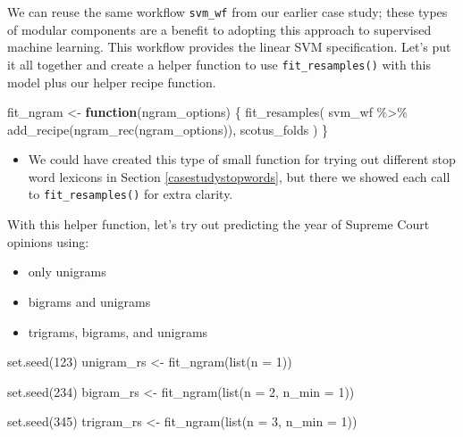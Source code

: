 \documentclass[
]{krantz}
\makeatletter
\newenvironment{Shaded}{\begin{snugshade}}{\end{snugshade}}
\newcommand{\AttributeTok}[1]{\textcolor[rgb]{0.77,0.63,0.00}{#1}}
\newcommand{\ControlFlowTok}[1]{\textcolor[rgb]{0.13,0.29,0.53}{\textbf{#1}}}
\newcommand{\DecValTok}[1]{\textcolor[rgb]{0.00,0.00,0.81}{#1}}
\newcommand{\FunctionTok}[1]{\textcolor[rgb]{0.00,0.00,0.00}{#1}}
\newcommand{\NormalTok}[1]{#1}
\newcommand{\OtherTok}[1]{\textcolor[rgb]{0.56,0.35,0.01}{#1}}
\newcommand{\SpecialCharTok}[1]{\textcolor[rgb]{0.00,0.00,0.00}{#1}}
\newenvironment{kframe}{%
\medskip{}
\setlength{\fboxsep}{.8em}
 \def\at@end@of@kframe{}%
 \ifinner\ifhmode%
  \def\at@end@of@kframe{\end{minipage}}%
  \begin{minipage}{\columnwidth}%
 \fi\fi%
 \def\FrameCommand##1{\hskip\@totalleftmargin \hskip-\fboxsep
 \colorbox{shadecolor}{##1}\hskip-\fboxsep
     \hskip-\linewidth \hskip-\@totalleftmargin \hskip\columnwidth}%
 \MakeFramed {\advance\hsize-\width
   \@totalleftmargin\z@ \linewidth\hsize
   \@setminipage}}%
 {\par\unskip\endMakeFramed%
 \at@end@of@kframe}
\renewenvironment{Shaded}{\begin{kframe}}{\end{kframe}}
\newenvironment{rmdblock}[1]
  {\begin{shaded*}
  \begin{itemize}[left = -1cm, labelsep = 1cm]
  \renewcommand{\labelitemi}{
    \raisebox{-.7\height}[0pt][0pt]{
      {\setkeys{Gin}{width=3em,keepaspectratio}\texttt{[image: images/\#1]}}
    }
  }
 
  \item
  }
  {
  \end{itemize}
  \end{shaded*}
  }
\newenvironment{rmdwarning}
  {\begin{rmdblock}{warning}}
  {\end{rmdblock}}
\makeatother
\begin{document}
We can reuse the same workflow \texttt{svm\_wf} from our earlier case study; these types of modular components are a benefit to adopting this approach to supervised machine learning. This workflow provides the linear SVM specification. Let's put it all together and create a helper function to use \texttt{fit\_resamples()} with this model plus our helper recipe function.

\begin{Shaded}
\begin{Highlighting}[]
\NormalTok{fit\_ngram }\OtherTok{\textless{}{-}} \ControlFlowTok{function}\NormalTok{(ngram\_options) \{}
  \FunctionTok{fit\_resamples}\NormalTok{(}
\NormalTok{    svm\_wf }\SpecialCharTok{\%\textgreater{}\%} \FunctionTok{add\_recipe}\NormalTok{(}\FunctionTok{ngram\_rec}\NormalTok{(ngram\_options)),}
\NormalTok{    scotus\_folds}
\NormalTok{  )}
\NormalTok{\}}
\end{Highlighting}
\end{Shaded}

\begin{rmdwarning}
We could have created this type of small function for trying out different stop word lexicons in Section \ref{casestudystopwords}, but there we showed each call to \texttt{fit\_resamples()} for extra clarity.
\end{rmdwarning}

With this helper function, let's try out predicting the year of Supreme Court opinions using:

\begin{itemize}
\item
  only unigrams
\item
  bigrams and unigrams
\item
  trigrams, bigrams, and unigrams
\end{itemize}

\begin{Shaded}
\begin{Highlighting}[]
\FunctionTok{set.seed}\NormalTok{(}\DecValTok{123}\NormalTok{)}
\NormalTok{unigram\_rs }\OtherTok{\textless{}{-}} \FunctionTok{fit\_ngram}\NormalTok{(}\FunctionTok{list}\NormalTok{(}\AttributeTok{n =} \DecValTok{1}\NormalTok{))}

\FunctionTok{set.seed}\NormalTok{(}\DecValTok{234}\NormalTok{)}
\NormalTok{bigram\_rs }\OtherTok{\textless{}{-}} \FunctionTok{fit\_ngram}\NormalTok{(}\FunctionTok{list}\NormalTok{(}\AttributeTok{n =} \DecValTok{2}\NormalTok{, }\AttributeTok{n\_min =} \DecValTok{1}\NormalTok{))}

\FunctionTok{set.seed}\NormalTok{(}\DecValTok{345}\NormalTok{)}
\NormalTok{trigram\_rs }\OtherTok{\textless{}{-}} \FunctionTok{fit\_ngram}\NormalTok{(}\FunctionTok{list}\NormalTok{(}\AttributeTok{n =} \DecValTok{3}\NormalTok{, }\AttributeTok{n\_min =} \DecValTok{1}\NormalTok{))}
\end{Highlighting}
\end{Shaded}
\end{document}
